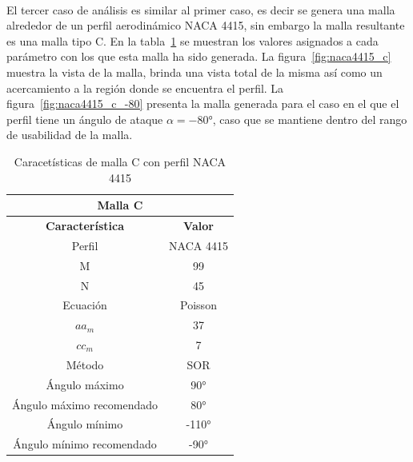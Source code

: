\documentclass[letterpaper, openright, 12pt]{book}
\begin{document}
    \paragraph*{}
    El tercer caso de análisis es similar al primer caso, es decir se genera una
    malla alrededor de un perfil aerodinámico NACA 4415, sin embargo la malla
    resultante es una malla tipo C. En la tabla~\ref{tabla_c_naca_4415} se
    muestran los valores asignados a cada parámetro con los que esta malla ha
    sido generada. La figura~\ref{fig:naca4415_c} muestra la vista de la malla,
    brinda una vista total de la misma así como un acercamiento a la región
    donde se encuentra el perfil. La figura~\ref{fig:naca4415_c_-80} presenta la
    malla generada para el caso en el que el perfil tiene un ángulo de ataque
    $\alpha = -80\si{\degree}$, caso que se mantiene dentro del rango de
    usabilidad de la malla.

    \begin{table}[htbp!]
    \begin{center}
        \begin{tabular}{| c | c |}
        \hline
        \multicolumn{2}{|c|}{Malla C}\\

        \hline
        \textbf{Característica} & \textbf{Valor} \\ \hline

        Perfil & NACA 4415
        \\ \hline

        M & 99
        \\ \hline

        N & 45
        \\ \hline

        Ecuación & Poisson
        \\\hline

        $aa_m$ & 37
        \\ \hline

        $cc_m$ & 7
        \\ \hline

        Método & SOR
        \\\hline

        Ángulo máximo & 90\si{\degree}
        \\ \hline

        Ángulo máximo recomendado & 80\si{\degree}
        \\ \hline

        Ángulo mínimo & -110\si{\degree}
        \\ \hline

        Ángulo mínimo recomendado & -90\si{\degree}
        \\ \hline
        \end{tabular}
        \caption{Caracetísticas de malla C con perfil NACA 4415}
    \label{tabla_c_naca_4415}
    \end{center}
    \end{table}
\end{document}
